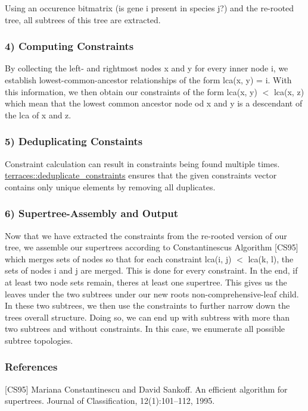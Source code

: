 Using an occurence bitmatrix (is gene i present in species j?) and the re-\/rooted tree, all subtrees of this tree are extracted.

\subsubsection*{4) Computing Constraints}

By collecting the left-\/ and rightmost nodes x and y for every inner node i, we establish lowest-\/common-\/ancestor relationships of the form lca(x, y) = i. With this information, we then obtain our constraints of the form lca(x, y) $<$ lca(x, z) which mean that the lowest common ancestor node od x and y is a descendant of the lca of x and z.

\subsubsection*{5) Deduplicating Constaints}

Constraint calculation can result in constraints being found multiple times. \hyperlink{namespaceterraces_a13888c94deeee29c8f5157c9071e3946}{terraces\+::deduplicate\+\_\+constraints} ensures that the given constraints vector contains only unique elements by removing all duplicates.

\subsubsection*{6) Supertree-\/\+Assembly and Output}

Now that we have extracted the constraints from the re-\/rooted version of our tree, we assemble our supertrees according to Constantinescu\textquotesingle{}s Algorithm \mbox{[}C\+S95\mbox{]} which merges sets of nodes so that for each constraint lca(i, j) $<$ lca(k, l), the sets of nodes i and j are merged. This is done for every constraint. In the end, if at least two node sets remain, there\textquotesingle{}s at least one supertree. This gives us the leaves under the two subtrees under our new root\textquotesingle{}s non-\/comprehensive-\/leaf child. In these two subtrees, we then use the constraints to further narrow down the tree\textquotesingle{}s overall structure. Doing so, we can end up with subtress with more than two subtrees and without constraints. In this case, we enumerate all possible subtree topologies.

\subsubsection*{References}

\mbox{[}C\+S95\mbox{]} Mariana Constantinescu and David Sankoff. An efficient algorithm for supertrees. Journal of Classification, 12(1)\+:101–112, 1995. 